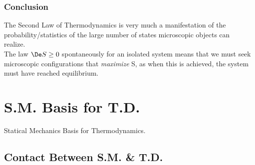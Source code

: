 \documentclass{article}
\begin{document}
\subsubsection{Conclusion}

The Second Law of Thermodynamics is very much a manifestation of the probability/statistics of the large number of states microscopic objects can realize. \\

The law $\De S \geq 0$ spontaneously for an isolated system means that we must seek microscopic configurations that \textit{maximize} S, as when this is achieved, the system must have reached equilibrium.

\section{S.M. Basis for T.D.}

Statical Mechanics Basis for Thermodynamics.

\subsection{Contact Between S.M. \& T.D.}
\end{document}
